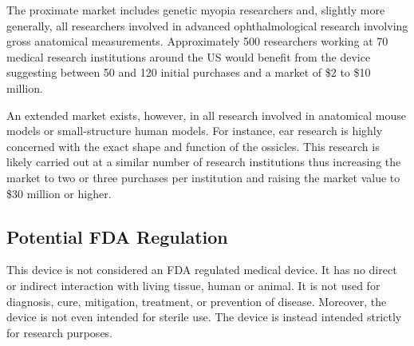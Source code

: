 \documentclass{article}
\begin{document}
The proximate market includes genetic myopia researchers and, slightly
more generally, all researchers involved in advanced ophthalmological
research involving gross anatomical measurements. Approximately 500
researchers working at 70 medical research institutions around the US
would benefit from the device suggesting between 50 and 120 initial
purchases and a market of \$2 to \$10 million.

An extended market exists, however, in all research involved in
anatomical mouse models or small-structure human models. For instance,
ear research is highly concerned with the exact shape and function of
the ossicles. This research is likely carried out at a similar number
of research institutions thus increasing the market to two or three
purchases per institution and raising the market value to \$30 million
or higher.

\subsection{Potential FDA Regulation}
\label{sec:potent-fda}

This device is not considered an FDA regulated medical device. It has
no direct or indirect interaction with living tissue, human or
animal. It is not used for diagnosis, cure, mitigation, treatment, or
prevention of disease. Moreover, the device is not even intended for
sterile use. The device is instead intended strictly for research
purposes.


\newpage


\end{document}

